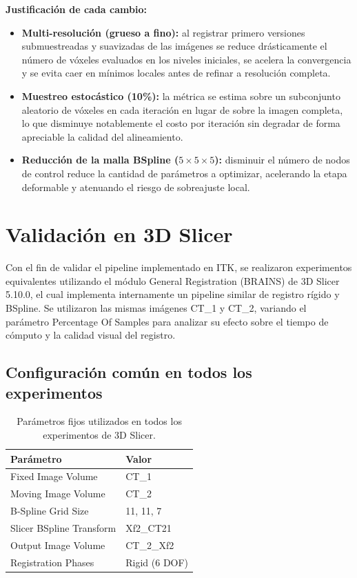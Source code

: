 \documentclass[12pt, letterpaper]{article}
\begin{document}
\noindent\textbf{Justificación de cada cambio:}
\begin{itemize}
    \item \textbf{Multi-resolución (grueso a fino):} al registrar primero
    versiones submuestreadas y suavizadas de las imágenes se reduce
    drásticamente el número de vóxeles evaluados en los niveles iniciales, se
    acelera la convergencia y se evita caer en mínimos locales antes de refinar
    a resolución completa.
    \item \textbf{Muestreo estocástico (10\%):} la métrica se estima sobre un
    subconjunto aleatorio de vóxeles en cada iteración en lugar de sobre la
    imagen completa, lo que disminuye notablemente el costo por iteración sin
    degradar de forma apreciable la calidad del alineamiento.
    \item \textbf{Reducción de la malla BSpline ($5\times5\times5$):} disminuir
    el número de nodos de control reduce la cantidad de parámetros a optimizar,
    acelerando la etapa deformable y atenuando el riesgo de sobreajuste local.
\end{itemize}

\section{Validación en 3D Slicer}
Con el fin de validar el pipeline implementado en ITK, se realizaron experimentos
equivalentes utilizando el módulo General Registration (BRAINS) de 3D Slicer 5.10.0,
el cual implementa internamente un pipeline similar de registro rígido y BSpline.
Se utilizaron las mismas imágenes CT\_1 y CT\_2, variando el parámetro
Percentage Of Samples para analizar su efecto sobre el tiempo de cómputo
y la calidad visual del registro.

\subsection{Configuración común en todos los experimentos}
\begin{table}[H]
\centering
\begin{tabular}{ll}
\toprule
\textbf{Parámetro} & \textbf{Valor} \\
\midrule
Fixed Image Volume & CT\_1 \\
Moving Image Volume & CT\_2 \\
B-Spline Grid Size & 11, 11, 7 \\
Slicer BSpline Transform & Xf2\_CT21 \\
Output Image Volume & CT\_2\_Xf2 \\
Registration Phases & Rigid (6 DOF) \\
\bottomrule
\end{tabular}
\caption{Parámetros fijos utilizados en todos los experimentos de 3D Slicer.}
\end{table}
\end{document}
